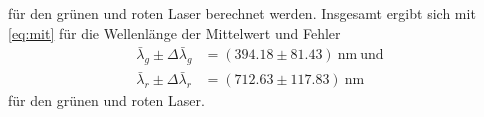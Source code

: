 für den grünen und roten Laser berechnet werden. Insgesamt ergibt sich mit \eqref{eq:mit} für die Wellenlänge der Mittelwert und Fehler 
\begin{align*}
  \bar \lambda_g \pm \Delta \bar \lambda_g&=(394.18 \pm 81.43)\ \textrm{nm}\ \textrm{und}\\
  \bar \lambda_r \pm \Delta \bar \lambda_r&=(712.63 \pm 117.83)\ \textrm{nm}
\end{align*}
für den grünen und roten Laser.
